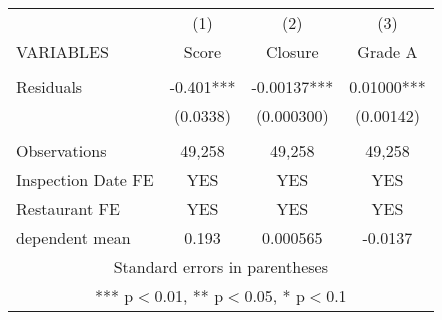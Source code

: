 \begin{tabular}{lccc} \hline
 & (1) & (2) & (3) \\
VARIABLES & Score & Closure & Grade A \\ \hline
 &  &  &  \\
Residuals & -0.401*** & -0.00137*** & 0.01000*** \\
 & (0.0338) & (0.000300) & (0.00142) \\
 &  &  &  \\
Observations & 49,258 & 49,258 & 49,258 \\
Inspection Date FE & YES & YES & YES \\
Restaurant FE & YES & YES & YES \\
 dependent mean & 0.193 & 0.000565 & -0.0137 \\ \hline
\multicolumn{4}{c}{ Standard errors in parentheses} \\
\multicolumn{4}{c}{ *** p$<$0.01, ** p$<$0.05, * p$<$0.1} \\
\end{tabular}
